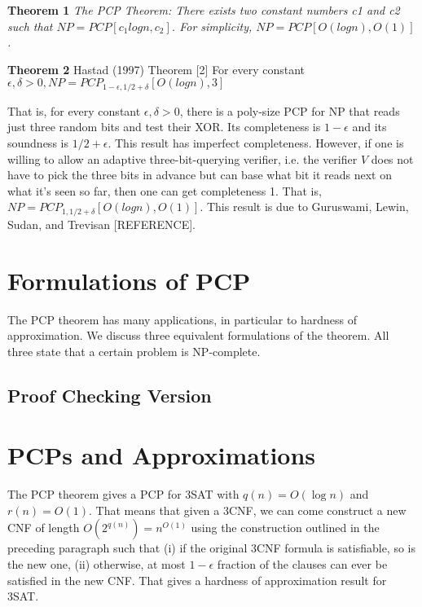 \textbf{Theorem 1} \textit{The PCP Theorem: There exists two constant numbers c1 and c2 such that $NP = PCP[c_1 log n, c_2]$. For simplicity, $NP = PCP[O(log n), O(1)]$.}

\textbf{Theorem 2} Hastad (1997) Theorem [2] For every constant $\epsilon, \delta > 0, NP = PCP_{1 - \epsilon,1/2+\delta} [O(log n), 3]$ 

That is, for every constant $\epsilon, \delta > 0$, there is a poly-size PCP for NP that reads just three random bits and test their XOR. Its completeness is $1 - \epsilon$ and its soundness is $1/2 + \epsilon$. This result has imperfect completeness. However, if one is willing to allow an adaptive three-bit-querying verifier, i.e. the verifier $V$ does not have to pick the three bits in advance but can base what bit it reads next on what it’s seen so far, then one can get completeness 1. That is, $NP = PCP_{1,1/2+\delta}[O(log n), O(1)]$. This result is due to Guruswami, Lewin,
Sudan, and Trevisan [REFERENCE].


\section{Formulations of PCP}
The PCP theorem has many applications, in particular to hardness of approximation. We discuss three equivalent formulations of the theorem. All three state that a certain problem is NP-complete.

\subsection{Proof Checking Version}



\section{PCPs and Approximations}
The PCP theorem gives a PCP for 3SAT with $q(n) = O(\log n)$ and $r(n) = O(1)$. That means that given a 3CNF, we can come construct a new CNF of length $O(2^{q(n)}) = n^{O(1)}$ using the construction outlined in the preceding paragraph such that (i) if the original 3CNF formula is satisfiable, so is the new one, (ii) otherwise, at most $1-\epsilon$ fraction of the clauses can ever be satisfied in the new CNF. That gives a hardness of approximation result for 3SAT. 

